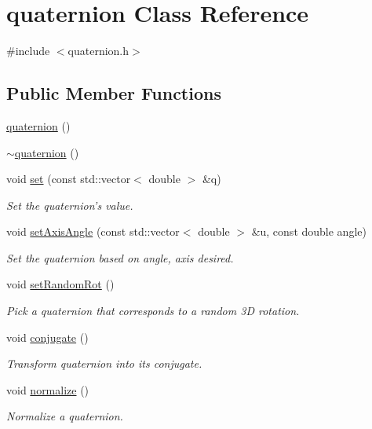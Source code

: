\hypertarget{classquaternion}{\section{quaternion Class Reference}
\label{classquaternion}
}


{\ttfamily \#include $<$quaternion.\-h$>$}

\subsection*{Public Member Functions}
\begin{DoxyCompactItemize}
\item 
\hyperlink{classquaternion_a66be1b74fcbd7d2bf8b92d0ff3760c03}{quaternion} ()
\item 
\hyperlink{classquaternion_afde1d3e0610d4e72a544ef8b329f0588}{$\sim$quaternion} ()
\item 
void \hyperlink{classquaternion_ad3b1869658470d5adae436fe6f98e1f0}{set} (const std\-::vector$<$ double $>$ \&q)
\begin{DoxyCompactList}\small\item\em Set the quaternion's value. \end{DoxyCompactList}\item 
void \hyperlink{classquaternion_a05a1549d902c5cd6401985caaf1a7e3f}{set\-Axis\-Angle} (const std\-::vector$<$ double $>$ \&u, const double angle)
\begin{DoxyCompactList}\small\item\em Set the quaternion based on angle, axis desired. \end{DoxyCompactList}\item 
void \hyperlink{classquaternion_a370e464ed34ec78540481a35b9a6829e}{set\-Random\-Rot} ()
\begin{DoxyCompactList}\small\item\em Pick a quaternion that corresponds to a random 3\-D rotation. \end{DoxyCompactList}\item 
void \hyperlink{classquaternion_a5500ac17c80600120b5036fee3796052}{conjugate} ()
\begin{DoxyCompactList}\small\item\em Transform quaternion into its conjugate. \end{DoxyCompactList}\item 
void \hyperlink{classquaternion_a056b14ed0f5b2ab02667aeedb58d1725}{normalize} ()
\begin{DoxyCompactList}\small\item\em Normalize a quaternion. \end{DoxyCompactList}\item 

\end{DoxyCompactItemize}
